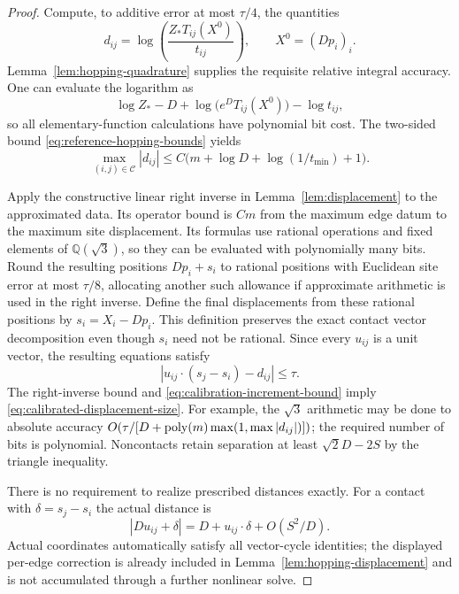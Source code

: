 \begin{proof}
Compute, to additive error at most $\tau/4$, the quantities
\begin{equation}
 d_{ij}=\log\left(\frac{Z_*T_{ij}(X^0)}{t_{ij}}\right),
 \qquad X^0=(Dp_i)_i.
 \label{eq:calibration-increments}
\end{equation}
Lemma~\ref{lem:hopping-quadrature} supplies the requisite relative
integral accuracy.  One can evaluate the logarithm as
\[
 \log Z_*-D+\log\bigl(e^D T_{ij}(X^0)\bigr)-\log t_{ij},
\]
so all elementary-function calculations have polynomial bit cost.
The two-sided bound \eqref{eq:reference-hopping-bounds} yields
\begin{equation}
 \max_{(i,j)\in\mathcal C}|d_{ij}|
   \le C\bigl(m+\log D+\log(1/t_{\min})+1\bigr).
 \label{eq:calibration-increment-bound}
\end{equation}

Apply the constructive linear right inverse in
Lemma~\ref{lem:displacement} to the approximated data.  Its
operator bound is $Cm$ from the maximum edge datum to the maximum
site displacement.  Its formulas use rational operations and
fixed elements of $\mathbb Q(\sqrt3)$, so they can be evaluated
with polynomially many bits.  Round the resulting positions
$Dp_i+s_i$ to rational positions with Euclidean site error at
most $\tau/8$, allocating another such allowance if approximate
arithmetic is used in the right inverse.  Define the final
displacements from these rational positions by
$s_i=X_i-Dp_i$.  This definition preserves the exact contact
vector decomposition even though $s_i$ need not be rational.
Since every $u_{ij}$ is a unit vector, the resulting equations
satisfy
\begin{equation}
 |u_{ij}\cdot(s_j-s_i)-d_{ij}|\le\tau.
 \label{eq:rounded-displacement-equations}
\end{equation}
The right-inverse bound and
\eqref{eq:calibration-increment-bound} imply
\eqref{eq:calibrated-displacement-size}.  For example, the
$\sqrt3$ arithmetic may be done to absolute accuracy
$O(\tau/[D+\operatorname{poly}(m)\max(1,\max|d_{ij}|)])$; the required number
of bits is polynomial.  Noncontacts retain separation at least
$\sqrt2D-2S$ by the triangle inequality.

There is no requirement to realize prescribed distances exactly.
For a contact with $\delta=s_j-s_i$ the actual distance is
\[
 |Du_{ij}+\delta|
   =D+u_{ij}\cdot\delta+O(S^2/D).
\]
Actual coordinates automatically satisfy all vector-cycle
identities; the displayed per-edge correction is already
included in Lemma~\ref{lem:hopping-displacement} and is not
accumulated through a further nonlinear solve.


\end{proof}
